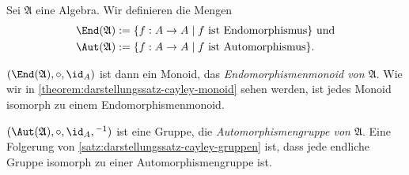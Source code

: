 \begin{example}
    Sei $\mathfrak{A}$ eine Algebra. Wir definieren die Mengen \begin{align*}
        \End(\mathfrak{A}) &:= \{f: A \to A \mid f\text{ ist Endomorphismus}\} \text{ und} \\ \Aut(\mathfrak{A}) &:= \{f: A \to A \mid f\text{ ist Automorphismus}\}.
    \end{align*}

    $(\End(\mathfrak{A}), \circ, \id_A)$ ist dann ein Monoid, das \emph{Endomorphismenmonoid von $\mathfrak{A}$}. Wie wir in \cref{theorem:darstellungssatz-cayley-monoid} sehen werden, ist jedes Monoid isomorph zu einem Endomorphismenmonoid.
    
    $(\Aut(\mathfrak{A}), \circ, \id_A, {}^{-1})$ ist eine Gruppe, die \emph{Automorphismengruppe von $\mathfrak{A}$}. Eine Folgerung von \cref{satz:darstellungssatz-cayley-gruppen} ist, dass jede endliche Gruppe isomorph zu einer Automorphismengruppe ist.
\end{example}
